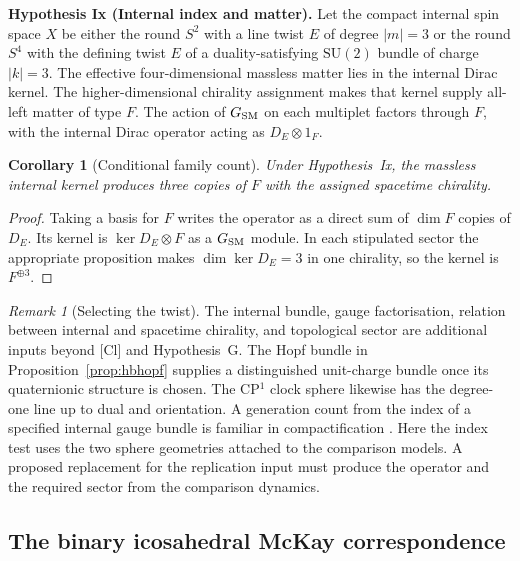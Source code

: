 \documentclass[aps,pra,onecolumn,superscriptaddress,nofootinbib,10pt]{revtex4-2}
\newtheorem{corollary}[theorem]{Corollary}
\theoremstyle{definition}
\theoremstyle{remark}
\newtheorem{remark}[theorem]{Remark}
\newcommand{\SU}{\mathrm{SU}}
\begin{document}
\smallskip\noindent\textbf{Hypothesis Ix (Internal index and matter).}  Let the compact internal spin space $X$ be either the round $S^2$
with a line twist $E$ of degree $|m|=3$ or the round $S^4$ with the
defining twist $E$ of a duality-satisfying $\SU(2)$ bundle
of charge $|k|=3$. The effective
four-dimensional massless matter lies in the internal Dirac kernel.
The higher-dimensional chirality assignment makes that kernel supply
all-left matter of type $F$. The action of $G_{\rm SM}$ on each
multiplet factors through $F$, with the internal Dirac operator acting
as $D_E\otimes 1_F$.


\begin{corollary}[Conditional family count]\label{gn:conditional}
Under Hypothesis~Ix, the massless internal kernel
produces three copies of $F$ with the assigned spacetime chirality.
\end{corollary}
\begin{proof}
Taking a basis for $F$ writes the operator as a direct sum of
$\dim F$ copies of $D_E$. Its kernel is $\ker D_E\otimes F$ as a
$G_{\rm SM}$ module. In each stipulated sector the appropriate proposition
makes $\dim\ker D_E=3$ in one chirality, so the kernel is $F^{\oplus3}$.
\end{proof}
\begin{remark}[Selecting the twist]\label{gn:selection}
The internal bundle, gauge factorisation, relation between internal
and spacetime chirality, and topological sector are additional inputs
beyond [Cl] and Hypothesis~G. The Hopf bundle in
Proposition~\ref{prop:hbhopf} supplies a distinguished unit-charge bundle
once its quaternionic structure is chosen. The CP$^1$ clock sphere
likewise has the degree-one line up to dual and orientation.
A generation count from the index of a specified internal gauge bundle
is familiar in compactification \cite{gn:chsw,gn:cim}. Here the index
test uses the two sphere geometries attached to the comparison models.
A proposed replacement for the replication input must produce the
operator and the required sector from the comparison dynamics.
\end{remark}

\subsection{The binary icosahedral McKay correspondence}\label{gn:binary}
\end{document}
